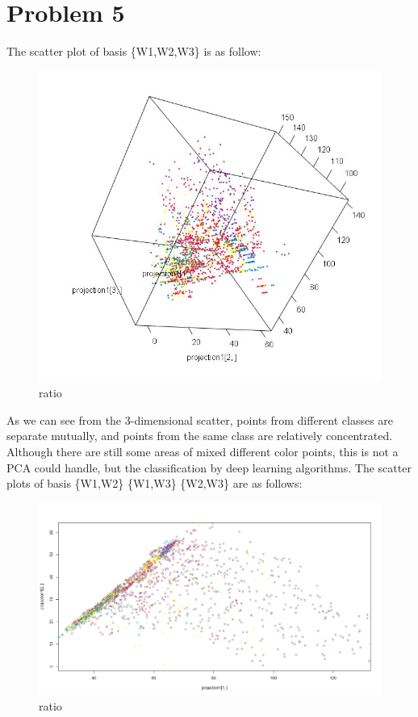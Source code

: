\documentclass{article}
\begin{document}
\section{Problem 5}
The scatter plot of basis \{W1,W2,W3\} is as follow:
  \begin{figure}[H]
  \centering
  \includegraphics[width=1.0\textwidth]{scatter3d.jpg}
  \caption{ratio}\label{}
  \end{figure}
As we can see from the 3-dimensional scatter, points from different classes are separate mutually, and points from the same class are relatively concentrated. Although there are still some areas of mixed different color points, this is not a PCA could handle, but the classification by deep learning algorithms.
The scatter plots of basis \{W1,W2\} \{W1,W3\} \{W2,W3\} are as follows:
  \begin{figure}[H]
  \centering
  \includegraphics[width=1.0\textwidth]{scatter12.jpg}
  \caption{ratio}\label{}
  \end{figure}
\end{document}
